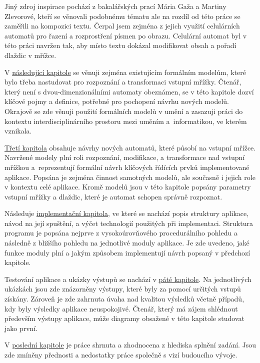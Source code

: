 Jiný zdroj inspirace pochází z bakalářských prací Mária Gaža a Martiny Zlevorové, kteří se věnovali podobnému tématu ale na rozdíl od této práce se zaměřili na kompozici textu. Čerpal jsem zejména z jejich využití celulárních automatů pro řazení a rozprostření písmen po obrazu. Celulární automat byl v této práci navržen tak, aby místo textu dokázal modifikovat obsah a pořadí dlaždic v mřížce.

V \hyperref[current]{následující kapitole} se věnuji zejména existujícím formálním modelům, které bylo třeba nastudovat pro rozpoznání a transformaci vstupní mřížky. Čtenář, který není s dvou-dimenzionálními automaty obeznámen, se v této kapitole dozví klíčové pojmy a definice, potřebné pro pochopení návrhu nových modelů. Okrajově se zde věnuji použití formálních modelů v umění a zasazuji práci do kontextu interdisciplinárního prostoru mezi uměním a~informatikou, ve kterém vznikala. 

\hyperref[newAutomata]{Třetí kapitola} obsahuje návrhy nových automatů, které působí na vstupní mřížce. Navržené modely plní roli rozpoznání, modifikace, a transformace nad vstupní mřížkou a~reprezentují formální návrh klíčových řídících prvků implementované aplikace. Popsána je zejména činnost samotných modelů, ale současně i jejich role v kontextu celé aplikace. Kromě modelů jsou v této kapitole popsány parametry vstupní mřížky a dlaždic, které je automat schopen správně rozpoznat.

Následuje \hyperref[impl]{implementační kapitola}, ve které se nachází popis struktury aplikace, návod na její spuštění, a výčet technologií použitých při implementaci. Struktura programu je popsána nejprve z vysokoúrovňového procedurálního pohledu a následně z bližšího pohledu na jednotlivé moduly aplikace. Je zde uvedeno, jaké funkce moduly plní a jakým způsobem implementují návrh popsaný v předchozí kapitole. 

Testování aplikace a ukázky výstupů se nachází v \hyperref[testing]{páté kapitole}. Na jednotlivých ukázkách jsou zde znázorněny výstupy, které byly za pomocí určitých vstupů získány. Zároveň je zde zahrnuta úvaha nad kvalitou výsledků včetně případů, kdy byly výsledky aplikace neuspokojivé. Čtenář, který má zájem shlédnout především výstupy aplikace, může diagramy obsažené v této kapitole studovat jako první.

V \hyperref[conclusion]{poslední kapitole} je práce shrnuta a zhodnocena z hlediska splnění zadání. Jsou zde zmíněny přednosti a nedostatky práce společně s vizí budoucího vývoje.

